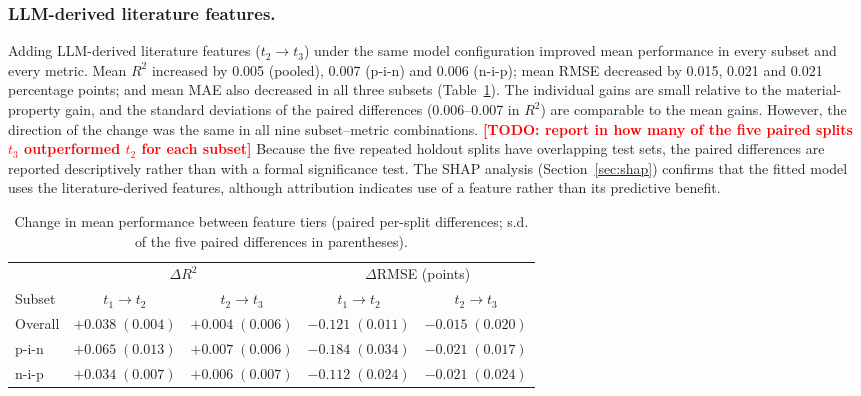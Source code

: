 \documentclass[3p]{elsarticle}
\newcommand{\authortodo}[1]{\textcolor{red}{\textbf{[TODO: #1]}}}
\begin{document}
\subsubsection{LLM-derived literature features.}
Adding LLM-derived literature features ($t_2 \rightarrow t_3$) under the same model configuration improved mean performance in every subset and every metric. Mean $R^2$ increased by 0.005 (pooled), 0.007 (p-i-n) and 0.006 (n-i-p); mean RMSE decreased by 0.015, 0.021 and 0.021 percentage points; and mean MAE also decreased in all three subsets (Table~\ref{tab:delta}). The individual gains are small relative to the material-property gain, and the standard deviations of the paired differences (0.006--0.007 in $R^2$) are comparable to the mean gains. However, the direction of the change was the same in all nine subset--metric combinations. \authortodo{report in how many of the five paired splits $t_3$ outperformed $t_2$ for each subset} Because the five repeated holdout splits have overlapping test sets, the paired differences are reported descriptively rather than with a formal significance test. The SHAP analysis (Section~\ref{sec:shap}) confirms that the fitted model uses the literature-derived features, although attribution indicates use of a feature rather than its predictive benefit.

\begin{table}[t]
\centering\small
\caption{Change in mean performance between feature tiers (paired per-split differences; s.d. of the five paired differences in parentheses).}
\label{tab:delta}
\begin{tabular}{lcccc}
\toprule
 & \multicolumn{2}{c}{$\Delta R^2$} & \multicolumn{2}{c}{$\Delta$RMSE (points)} \\
\cmidrule(lr){2-3}\cmidrule(lr){4-5}
Subset & $t_1\!\to\! t_2$ & $t_2\!\to\! t_3$ & $t_1\!\to\! t_2$ & $t_2\!\to\! t_3$ \\
\midrule
Overall & $+0.038\;(0.004)$ & $+0.004\;(0.006)$ & $-0.121\;(0.011)$ & $-0.015\;(0.020)$ \\
p-i-n   & $+0.065\;(0.013)$ & $+0.007\;(0.006)$ & $-0.184\;(0.034)$ & $-0.021\;(0.017)$ \\
n-i-p   & $+0.034\;(0.007)$ & $+0.006\;(0.007)$ & $-0.112\;(0.024)$ & $-0.021\;(0.024)$ \\
\bottomrule
\end{tabular}
\end{table}
\end{document}

